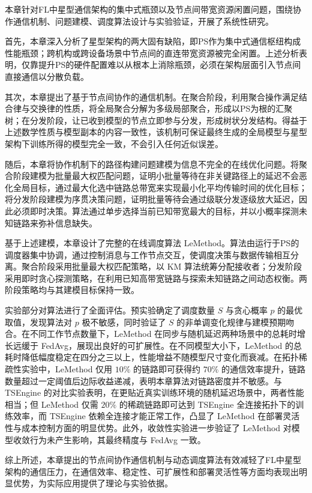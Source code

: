 \documentclass[master, vlined]{DissertUESTC}
\begin{document}
	本章针对FL中星型通信架构的集中式瓶颈以及节点间带宽资源闲置问题，围绕协作通信机制、问题建模、调度算法设计与实验验证，开展了系统性研究。

	首先，本章深入分析了星型架构的两大固有缺陷，即PS作为集中式通信枢纽构成性能瓶颈；跨机构或跨设备场景中节点间的直连带宽资源被完全闲置。上述分析表明，仅靠提升PS的硬件配置难以从根本上消除瓶颈，必须在架构层面引入节点间直接通信以分散负载。

	其次，本章提出了基于节点间协作的通信机制。在聚合阶段，利用聚合操作满足结合律与交换律的性质，将全局聚合分解为多级局部聚合，形成以PS为根的汇聚树；在分发阶段，让已收到模型的节点立即参与分发，形成树状分发结构。得益于上述数学性质与模型副本的内容一致性，该机制可保证最终生成的全局模型与星型架构下训练所得的模型完全一致，不会引入任何近似误差。

	随后，本章将协作机制下的路径构建问题建模为信息不完全的在线优化问题。将聚合阶段建模为批量最大权匹配问题，证明小批量等待在非关键路径上的延迟不会恶化全局目标，通过最大化选中链路总带宽来实现最小化平均传输时间的优化目标；将分发阶段建模为序贯决策问题，证明批量等待会通过级联分发逐级放大延迟，因此必须即时决策。算法通过单步选择当前已知带宽最大的目标，并以小概率探测未知链路来弥补信息缺失。

	基于上述建模，本章设计了完整的在线调度算法 LeMethod。算法由运行于PS的调度器集中协调，通过控制消息与工作节点交互，使调度决策与数据传输相互分离。聚合阶段采用批量最大权匹配策略，以 KM 算法统筹分配接收者；分发阶段采用即时贪心探测策略，在利用已知高带宽链路与探索未知链路之间动态权衡。两阶段策略均与其建模目标保持一致。

	实验部分对算法进行了全面评估。预实验确定了调度数量 $S$ 与贪心概率 $p$ 的最优取值，发现算法对 $p$ 极不敏感，同时验证了 $S$ 的非单调变化规律与建模预期吻合。在不同工作节点数量下，LeMethod 在同步与随机延迟两种场景中的总耗时增长远缓于 FedAvg，展现出良好的可扩展性。在不同模型大小下，LeMethod 的总耗时降低幅度稳定在四分之三以上，性能增益不随模型尺寸变化而衰减。在拓扑稀疏性实验中，LeMethod 仅用 $10\%$ 的链路即可获得约 $70\%$ 的通信效率提升，链路数量超过一定阈值后边际收益递减，表明本章算法对链路密度并不敏感。与 TSEngine 的对比实验表明，在更贴近真实训练环境的随机延迟场景中，两者性能相当；但 LeMethod 仅需 $20\%$ 的稀疏链路即可达到 TSEngine 全连接拓扑下的训练效率，而 TSEngine 依赖全连接才能正常工作，凸显了 LeMethod 在部署灵活性与成本控制方面的明显优势。此外，收敛性实验进一步验证了 LeMethod 对模型收敛行为未产生影响，其最终精度与 FedAvg 一致。

	综上所述，本章提出的节点间协作通信机制与动态调度算法有效减轻了FL中星型架构的通信压力，在通信效率、稳定性、可扩展性和部署灵活性等方面均表现出明显优势，为实际应用提供了理论与实验依据。
\end{document}
